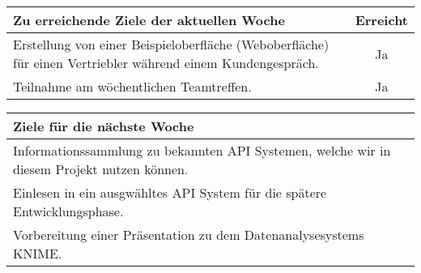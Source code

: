 \begin{tabularx}{\textwidth}{Xc}
    \arrayrulecolor{OliveGreen}
    \toprule
    {\bfseries Zu erreichende Ziele der aktuellen Woche} & {\bfseries Erreicht} \\
    \midrule[2pt]
    Erstellung von einer Beispieloberfläche (Weboberfläche) für einen 
    Vertriebler während einem Kundengespräch.  &Ja                           \\
    \rowcolor{OliveGreen!15}
    Teilnahme am wöchentlichen Teamtreffen.  &Ja                             \\
    \bottomrule[2pt]
\end{tabularx}
%
\vspace{1cm}
%
\begin{tabularx}{\textwidth}{Xc}
    \arrayrulecolor{OliveGreen}
    \toprule
    {\bfseries Ziele für die nächste Woche}              &                   \\
    \midrule[2pt]
    Informationssammlung zu bekannten API Systemen, welche wir in diesem
    Projekt nutzen können.                               &                   \\
    \rowcolor{OliveGreen!15}
    Einlesen in ein ausgwähltes API System für die spätere Entwicklungsphase. & \\
    \rowcolor{White}
    Vorbereitung einer Präsentation zu dem Datenanalysesystems KNIME. &      \\
\end{tabularx}
